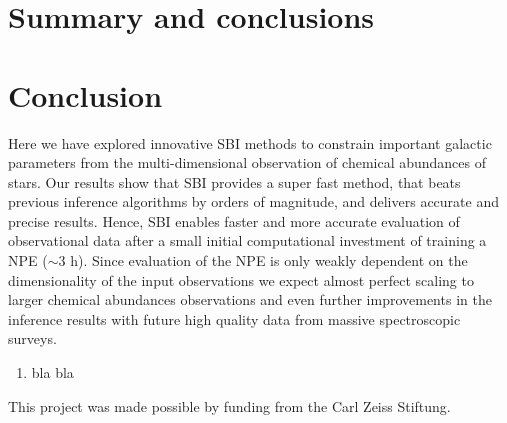 \documentclass{aa}
\begin{document}
\section{Summary and conclusions}
\label{sec: conclusion}

\section{Conclusion}
\vspace{-1em}
Here we have explored innovative SBI methods to constrain important galactic parameters from the multi-dimensional observation of chemical abundances of stars. Our results show that SBI provides a super fast method, that beats previous inference algorithms by orders of magnitude, and delivers accurate and precise results. Hence, SBI enables faster and more accurate evaluation of observational data after a small initial computational investment of training a NPE ($\sim3$ h). Since evaluation of the NPE is only weakly dependent on the dimensionality of the input observations we expect almost perfect scaling to larger chemical abundances observations and even further improvements in the inference results with future high quality data from massive spectroscopic surveys. 


   \begin{enumerate}
      \item bla bla
      \end{enumerate}


\begin{acknowledgements}
      This project was made possible by funding from the Carl Zeiss Stiftung.
\end{acknowledgements}

%
%



\end{document}
